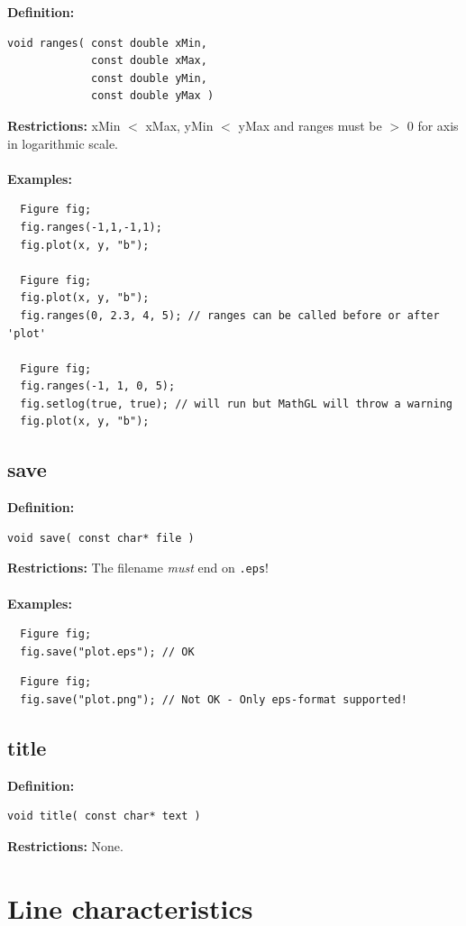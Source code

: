 \documentclass[a4paper]{article}
\newcommand{\command}[1]{\subsection{#1}}
\begin{document}
\textbf{Definition:}
\begin{lstlisting}
void ranges( const double xMin, 
             const double xMax, 
             const double yMin, 
             const double yMax )
\end{lstlisting}
%
\textbf{Restrictions:} xMin $<$ xMax, yMin $<$ yMax and ranges must be $>$ 0 for axis in logarithmic scale. \\ \\
%
\textbf{Examples:}
\begin{lstlisting}
  Figure fig;
  fig.ranges(-1,1,-1,1);
  fig.plot(x, y, "b");

  Figure fig;
  fig.plot(x, y, "b");
  fig.ranges(0, 2.3, 4, 5); // ranges can be called before or after 'plot'

  Figure fig;
  fig.ranges(-1, 1, 0, 5);
  fig.setlog(true, true); // will run but MathGL will throw a warning 
  fig.plot(x, y, "b");
\end{lstlisting}

\command{save}

\textbf{Definition:}
\begin{lstlisting}
void save( const char* file )
\end{lstlisting}
%
\textbf{Restrictions:} The filename \textit{must} end on \texttt{.eps}! \\ \\
%
\textbf{Examples:}
\begin{lstlisting}
  Figure fig;
  fig.save("plot.eps"); // OK
\end{lstlisting}
\begin{lstlisting}
  Figure fig;
  fig.save("plot.png"); // Not OK - Only eps-format supported!
\end{lstlisting}

\command{title}

\textbf{Definition:}
\begin{lstlisting}
void title( const char* text )
\end{lstlisting}
%
\textbf{Restrictions:} None.

\section{Line characteristics}
\end{document}
